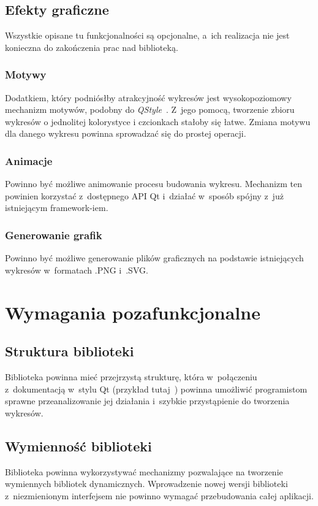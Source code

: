 \documentclass[11pt,twoside,a4paper,final]{article}
\begin{document}
\subsection{Efekty graficzne}
Wszystkie opisane tu funkcjonalności są opcjonalne, a~ich realizacja nie jest konieczna do zakończenia prac nad biblioteką.

\subsubsection{Motywy}
Dodatkiem, który podniósłby atrakcyjność wykresów jest wysokopoziomowy mechanizm motywów, podobny do \textit{QStyle}~\cite{qstyle}. Z~jego pomocą, tworzenie zbioru wykresów o jednolitej kolorystyce i czcionkach stałoby się łatwe. Zmiana motywu dla danego wykresu powinna sprowadzać się do prostej operacji.

\subsubsection{Animacje}
Powinno być możliwe animowanie procesu budowania wykresu. Mechanizm ten powinien korzystać z~dostępnego API Qt\cite{qt-anim} i~działać w~sposób spójny z~już istniejącym framework-iem.

\subsubsection{Generowanie grafik}
Powinno być możliwe generowanie plików graficznych na podstawie istniejących wykresów w~formatach .PNG i~.SVG.



\section{Wymagania pozafunkcjonalne}


\subsection{Struktura biblioteki}
Biblioteka powinna mieć przejrzystą strukturę, która w~połączeniu z~dokumentacją w~stylu Qt (przykład tutaj~\cite{qt-doc}) powinna umożliwić programistom sprawne przeanalizowanie jej działania i~szybkie przystąpienie do tworzenia wykresów.

\subsection{Wymienność biblioteki}
Biblioteka powinna wykorzystywać mechanizmy pozwalające na tworzenie wymiennych bibliotek dynamicznych. Wprowadzenie nowej wersji biblioteki z~niezmienionym interfejsem nie powinno wymagać przebudowania całej aplikacji.
\end{document}
